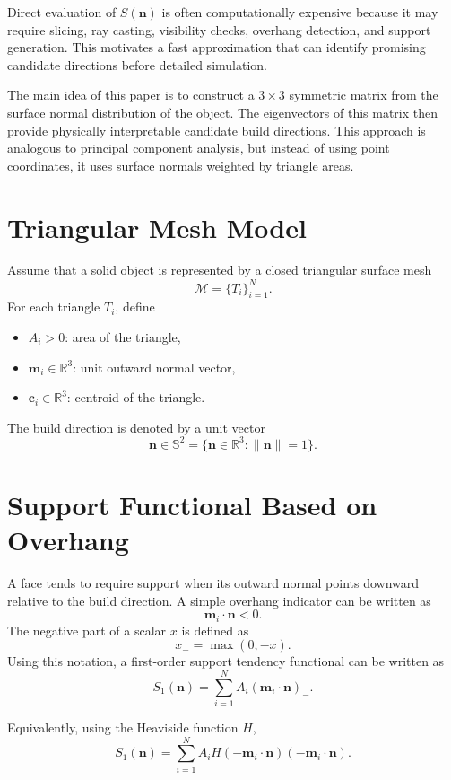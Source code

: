 \documentclass[11pt,a4paper]{article}
\begin{document}
Direct evaluation of $S(\bm n)$ is often computationally expensive because it may require slicing, ray casting, visibility checks, overhang detection, and support generation.
This motivates a fast approximation that can identify promising candidate directions before detailed simulation.

The main idea of this paper is to construct a $3\times 3$ symmetric matrix from the surface normal distribution of the object.
The eigenvectors of this matrix then provide physically interpretable candidate build directions.
This approach is analogous to principal component analysis, but instead of using point coordinates, it uses surface normals weighted by triangle areas.

\section{Triangular Mesh Model}

Assume that a solid object is represented by a closed triangular surface mesh
\[
\mathcal M = \{T_i\}_{i=1}^{N}.
\]
For each triangle $T_i$, define

\begin{itemize}
\item $A_i > 0$: area of the triangle,
\item $\bm m_i \in \mathbb R^3$: unit outward normal vector,
\item $\bm c_i \in \mathbb R^3$: centroid of the triangle.
\end{itemize}

The build direction is denoted by a unit vector
\[
\bm n \in \mathbb S^2
=
\{\bm n\in\mathbb R^3:\|\bm n\|=1\}.
\]

\section{Support Functional Based on Overhang}

A face tends to require support when its outward normal points downward relative to the build direction.
A simple overhang indicator can be written as
\[
\bm m_i\cdot \bm n < 0.
\]
The negative part of a scalar $x$ is defined as
\[
x_-=\max(0,-x).
\]
Using this notation, a first-order support tendency functional can be written as
\begin{equation}
S_1(\bm n)
=
\sum_{i=1}^{N} A_i (\bm m_i\cdot \bm n)_-.
\label{eq:first_order_support}
\end{equation}

Equivalently, using the Heaviside function $H$,
\begin{equation}
S_1(\bm n)
=
\sum_{i=1}^{N}
A_i
H(-\bm m_i\cdot \bm n)
(-\bm m_i\cdot \bm n).
\label{eq:heaviside_support}
\end{equation}
\end{document}
